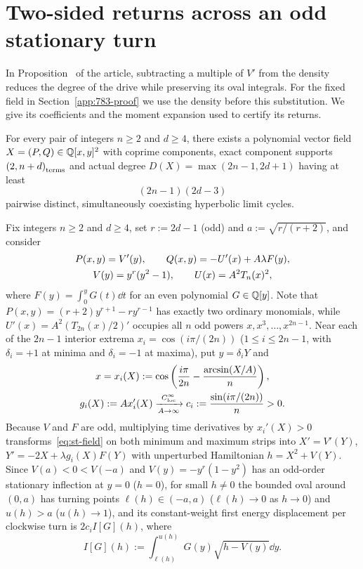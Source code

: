 \section{Two-sided returns across an odd stationary turn}\label{sec:stationary}
In Proposition~ of the article, subtracting a multiple of \(V'\) from the density reduces the degree of the drive while preserving its oval integrals. For the fixed field in Section~\ref{app:783-proof} we use the density before this substitution. We give its coefficients and the moment expansion used to certify its returns.

\begin{theorem}\label{thm:stationary-turn}
For every pair of integers $n\ge 2$ and $d\ge 4$, there exists a polynomial vector field $X=(P,Q)\in\mathbb{Q}[x,y]^2$ with coprime components, exact component supports $\left(2,n+d\right)_{\mathrm{terms}}$ and actual degree $D(X)=\max(2n-1,2d+1)$ having at least
\begin{equation}\label{eq:stationary-count}
  (2n-1)(2d-3)
\end{equation}
pairwise distinct, simultaneously coexisting hyperbolic limit cycles.
\end{theorem}

Fix integers $n\ge 2$ and $d\ge 4$, set $r:=2d-1$ (odd) and $a:=\sqrt{r/(r+2)}$, and consider
\begin{gather}
  P(x,y) = V'(y), \qquad Q(x,y) = -U'(x) + A\lambda F(y), \notag\\
  V(y) = y^r(y^2-1), \qquad U(x) = A^2 T_n(x)^2,\label{eq:st-field}
\end{gather}
where $F(y)=\int_0^y G(t)\dd t$ for an even polynomial $G\in\mathbb{Q}[y]$. Note that $P(x,y)=(r+2)y^{r+1}-ry^{r-1}$ has exactly two ordinary monomials, while $U'(x)=A^2(T_{2n}(x)/2)'$ occupies all $n$ odd powers $x,x^3,\dots,x^{2n-1}$. Near each of the $2n-1$ interior extrema $x_i=\cos(i\pi/(2n))$ ($1\le i\le 2n-1$, with $\delta_i=+1$ at minima and $\delta_i=-1$ at maxima), put $y=\delta_i Y$ and
\begin{gather}
  x = x_i(X) := \cos\left(\frac{i\pi}{2n} - \frac{\arcsin(X/A)}{n}\right), \notag\\
  g_i(X) := A x_i'(X) \xrightarrow[A\to\infty]{C^\infty_{\mathrm{loc}}} c_i := \frac{\sin(i\pi/(2n))}{n} > 0.\label{eq:st-chart}
\end{gather}
Because $V$ and $F$ are odd, multiplying time derivatives by $x_i'(X)>0$ transforms~\eqref{eq:st-field} on both minimum and maximum strips into $X'=V'(Y)$, $Y'=-2X+\lambda g_i(X)F(Y)$ with unperturbed Hamiltonian $h=X^2+V(Y)$. Since $V(a)<0<V(-a)$ and $V(y)=-y^r(1-y^2)$ has an odd-order stationary inflection at $y=0$ ($h=0$), for small $h\ne 0$ the bounded oval around $(0,a)$ has turning points $\ell(h)\in(-a,a)$ ($\ell(h)\to 0$ as $h\to 0$) and $u(h)>a$ ($u(h)\to 1$), and its constant-weight first energy displacement per clockwise turn is $2c_i I[G](h)$, where
\begin{equation}\label{eq:st-integral}
  I[G](h) := \int_{\ell(h)}^{u(h)} G(y)\sqrt{h-V(y)}\dd y.
\end{equation}

